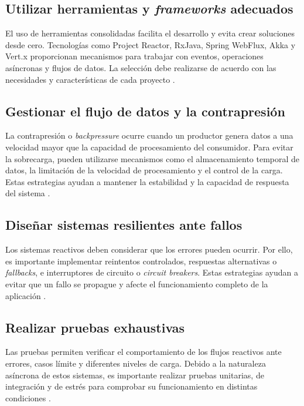 \documentclass[12pt, letterpaper]{article}
\begin{document}
\subsection*{Utilizar herramientas y \textit{frameworks} adecuados}
El uso de herramientas consolidadas facilita el desarrollo y evita crear soluciones desde cero. Tecnologías como Project Reactor, RxJava, Spring WebFlux, Akka y Vert.x proporcionan mecanismos para trabajar con eventos, operaciones asíncronas y flujos de datos. La selección debe realizarse de acuerdo con las necesidades y características de cada proyecto \parencites{saeed2025reactive}{sousa2025java}.

\subsection*{Gestionar el flujo de datos y la contrapresión}
La contrapresión o \textit{backpressure} ocurre cuando un productor genera datos a una velocidad mayor que la capacidad de procesamiento del consumidor. Para evitar la sobrecarga, pueden utilizarse mecanismos como el almacenamiento temporal de datos, la limitación de la velocidad de procesamiento y el control de la carga. Estas estrategias ayudan a mantener la estabilidad y la capacidad de respuesta del sistema \parencites{saeed2025reactive}{sousa2025java}.

\subsection*{Diseñar sistemas resilientes ante fallos}
Los sistemas reactivos deben considerar que los errores pueden ocurrir. Por ello, es importante implementar reintentos controlados, respuestas alternativas o \textit{fallbacks}, e interruptores de circuito o \textit{circuit breakers}. Estas estrategias ayudan a evitar que un fallo se propague y afecte el funcionamiento completo de la aplicación \parencite{saeed2025reactive}.

\subsection*{Realizar pruebas exhaustivas}
Las pruebas permiten verificar el comportamiento de los flujos reactivos ante errores, casos límite y diferentes niveles de carga. Debido a la naturaleza asíncrona de estos sistemas, es importante realizar pruebas unitarias, de integración y de estrés para comprobar su funcionamiento en distintas condiciones \parencites{saeed2025reactive}{aiimtech2024understanding}.
\end{document}
